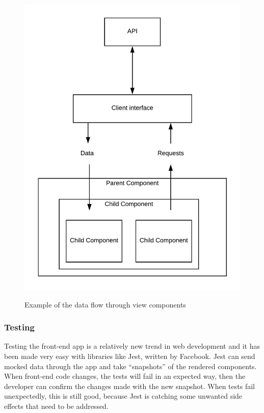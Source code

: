 \documentclass[draftclsnofoot,onecolumn,journal,letterpaper,compsoc,10pt]{IEEEtran}
\begin{document}
    \begin{figure}[H]
        \centering
        \caption{Example of the data flow through view components}
        \includegraphics[origin=c]{./diagrams/front-end-diagram.jpeg}
        \label{front-end}
    \end{figure}
    
    \subsubsection{Testing}
    Testing the front-end app is a relatively new trend in web development and it has been made very easy with libraries like Jest, written by Facebook. Jest can send mocked data through the app and take “snapshots” of the rendered components. When front-end code changes, the tests will fail in an expected way, then the developer can confirm the changes made with the new snapshot. When tests fail unexpectedly, this is still good, because Jest is catching some unwanted side effects that need to be addressed.
\end{document}
